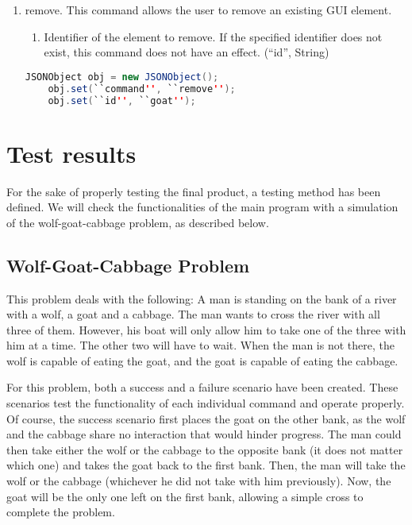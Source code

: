 \documentclass[11pt,a4paper]{article}
\begin{document}
\begin{enumerate}
	\item remove. This command allows the user to remove an existing GUI element.
		\begin{enumerate}
			\item Identifier of the element to remove. If the specified identifier does not exist, this command does not have an effect. (``id'', String)
		\end{enumerate}
	\begin{lstlisting}[language=java]
	JSONObject obj = new JSONObject();
	obj.set(``command'', ``remove'');
	obj.set(``id'', ``goat'');
	\end{lstlisting}
\end{enumerate}


\section{Test results}

For the sake of properly testing the final product, a testing method has been defined. We will check the functionalities of the main program with a simulation of the wolf-goat-cabbage problem, as described below.

\subsection{Wolf-Goat-Cabbage Problem}
This problem deals with the following: A man is standing on the bank of a river with a wolf, a goat and a cabbage. The man wants to cross the river with all three of them. However, his boat will only allow him to take one of the three with him at a time. The other two will have to wait. When the man is not there, the wolf is capable of eating the goat, and the goat is capable of eating the cabbage.

For this problem, both a success and a failure scenario have been created. These scenarios test the functionality of each individual command and operate properly. Of course, the success scenario first places the goat on the other bank, as the wolf and the cabbage share no interaction that would hinder progress. The man could then take either the wolf or the cabbage to the opposite bank (it does not matter which one) and takes the goat back to the first bank. Then, the man will take the wolf or the cabbage (whichever he did not take with him previously). Now, the goat will be the only one left on the first bank, allowing a simple cross to complete the problem.
\end{document}

